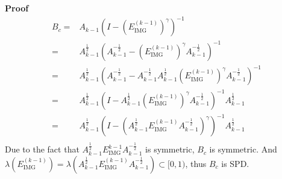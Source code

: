 \documentclass{article}
\begin{document}
\textbf{Proof}
\begin{equation*}
    \begin{aligned}
        B_c= & A_{k-1}(I-(E_\text{IMG}^{(k-1)})^\gamma)^{-1}                                                                                                      \\
        =    & A_{k-1}^{\frac{1}{2}}(A_{k-1}^{-\frac{1}{2}}-(E_\text{IMG}^{(k-1)})^\gamma A_{k-1}^{-\frac{1}{2}})^{-1}                                            \\
        =    & A_{k-1}^{\frac{1}{2}}(A_{k-1}^{-\frac{1}{2}}-A_{k-1}^{-\frac{1}{2}}A_{k-1}^{\frac{1}{2}}(E_\text{IMG}^{(k-1)})^\gamma A_{k-1}^{-\frac{1}{2}})^{-1} \\
        =    & A_{k-1}^{\frac{1}{2}}(I-A_{k-1}^{\frac{1}{2}}(E_\text{IMG}^{(k-1)})^\gamma A_{k-1}^{-\frac{1}{2}})^{-1} A_{k-1}^{\frac{1}{2}}                      \\
        =    & A_{k-1}^{\frac{1}{2}}(I-(A_{k-1}^{\frac{1}{2}} E_\text{IMG}^{(k-1)} A_{k-1}^{-\frac{1}{2}})^\gamma)^{-1} A_{k-1}^{\frac{1}{2}}                     \\
    \end{aligned}
\end{equation*}
Due to the fact that $A_{k-1}^{\frac{1}{2}} E_\text{IMG}^{k-1} A_{k-1}^{-\frac{1}{2}}$ is symmetric, $B_c$ is symmetric. And $\lambda(E_\text{IMG}^{(k-1)})=\lambda(A_{k-1}^{\frac{1}{2}} E_\text{IMG}^{(k-1)} A_{k-1}^{-\frac{1}{2}})\subset[0,1)$, thus $B_c$ is SPD.
\end{document}
